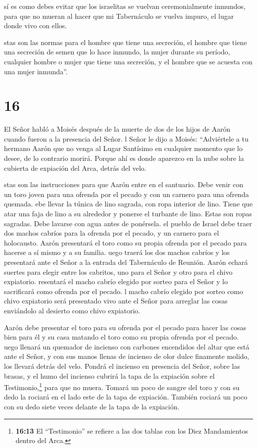  sí es como debes evitar que los israelitas se vuelvan
ceremonialmente inmundos, para que no mueran al hacer que mi Tabernáculo
se vuelva impuro, el lugar donde vivo con ellos.

 stas son las normas para el hombre que tiene una
secreción, el hombre que tiene una secreción de semen que lo hace
inmundo,  la mujer durante su período, cualquier hombre o
mujer que tiene una secreción, y el hombre que se acuesta con una mujer
inmunda''.

\hypertarget{section-15}{%
\section{16}\label{section-15}}

 El Señor habló a Moisés después de la muerte de dos de los
hijos de Aarón cuando fueron a la presencia del Señor.  l
Señor le dijo a Moisés: ``Adviértele a tu hermano Aarón que no venga al
Lugar Santísimo en cualquier momento que lo desee, de lo contrario
morirá. Porque ahí es donde aparezco en la nube sobre la cubierta de
expiación del Arca, detrás del velo.

 stas son las instrucciones para que Aarón entre en el
santuario. Debe venir con un toro joven para una ofrenda por el pecado y
con un carnero para una ofrenda quemada.  ebe llevar la
túnica de lino sagrada, con ropa interior de lino. Tiene que atar una
faja de lino a su alrededor y ponerse el turbante de lino. Estas son
ropas sagradas. Debe lavarse con agua antes de ponérsela. 
el pueblo de Israel debe traer dos machos cabríos para la ofrenda por el
pecado, y un carnero para el holocausto.  Aarón presentará
el toro como su propia ofrenda por el pecado para hacerse a sí mismo y a
su familia.  uego traerá los dos machos cabríos y los
presentará ante el Señor a la entrada del Tabernáculo de Reunión.
 Aarón echará suertes para elegir entre los cabritos, uno
para el Señor y otro para el chivo expiatorio.  resentará el
macho cabrío elegido por sorteo para el Señor y lo sacrificará como
ofrenda por el pecado.  l macho cabrío elegido por sorteo
como chivo expiatorio será presentado vivo ante el Señor para arreglar
las cosas enviándolo al desierto como chivo expiatorio.

 Aarón debe presentar el toro para su ofrenda por el pecado
para hacer las cosas bien para él y su casa matando el toro como su
propia ofrenda por el pecado.  uego llenará un quemador de
incienso con carbones encendidos del altar que está ante el Señor, y con
sus manos llenas de incienso de olor dulce finamente molido, los llevará
detrás del velo.  Pondrá el incienso en presencia del
Señor, sobre las brasas, y el humo del incienso cubrirá la tapa de la
expiación sobre el Testimonio,\footnote{\textbf{16:13} El ``Testimonio''
  se refiere a las dos tablas con los Diez Mandamientos dentro del Arca.}
para que no muera.  Tomará un poco de sangre del toro y con
su dedo la rociará en el lado este de la tapa de expiación. También
rociará un poco con su dedo siete veces delante de la tapa de la
expiación.


